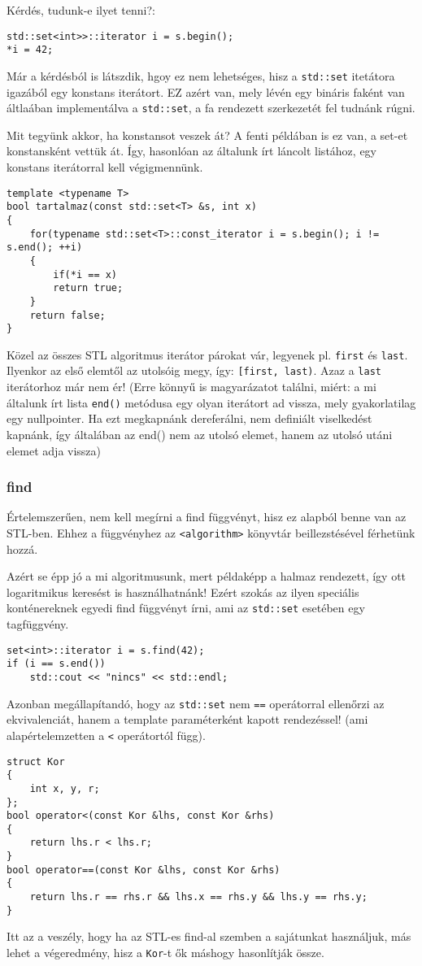 \documentclass[a4paper,11.5pt]{article}
\begin{document}
	\medskip
	Kérdés, tudunk-e ilyet tenni?:
\begin{lstlisting}
std::set<int>>::iterator i = s.begin();
*i = 42;
\end{lstlisting}
	Már a kérdésból is látszdik, hgoy ez nem lehetséges, hisz a \texttt{std::set} itetátora igazából egy konstans iterátort. EZ azért van, mely lévén egy bináris faként van áltlaában implementálva a \texttt{std::set}, a fa rendezett szerkezetét fel tudnánk rúgni.
	
	\smallskip
	Mit tegyünk akkor, ha konstansot veszek át? A fenti példában is ez van, a set-et konstansként vettük át. Így, hasonlóan az általunk írt láncolt listához, egy konstans iterátorral kell végigmennünk.
\begin{lstlisting}
template <typename T>
bool tartalmaz(const std::set<T> &s, int x)
{
	for(typename std::set<T>::const_iterator i = s.begin(); i != s.end(); ++i)
	{
		if(*i == x)
		return true;
	}
	return false;
}
\end{lstlisting}
	
	\medskip
	Közel az összes STL algoritmus iterátor párokat vár, legyenek pl. \texttt{first} és \texttt{last}. Ilyenkor az első elemtől az utolsóig megy, így: \texttt{[first, last)}. Azaz a \texttt{last} iterátorhoz már nem ér! (Erre könnyű is magyarázatot találni, miért: a mi általunk írt lista \texttt{end()} metódusa egy olyan iterátort ad vissza, mely gyakorlatilag egy nullpointer. Ha ezt megkapnánk dereferálni, nem definiált viselkedést kapnánk, így általában az end() nem az utolsó elemet, hanem az utolsó utáni elemet adja vissza)
	
	\subsubsection{find}
	Értelemszerűen, nem kell megírni a find függvényt, hisz ez alapból benne van az STL-ben. Ehhez a függvényhez az \texttt{<algorithm>} könyvtár beillezstésével férhetünk hozzá. 
	
	\medskip
	Azért se épp jó a mi algoritmusunk, mert példaképp a halmaz rendezett, így ott logaritmikus keresést is használhatnánk! Ezért szokás az ilyen speciális konténereknek egyedi find függvényt írni, ami az \texttt{std::set} esetében egy tagfüggvény. 
\begin{lstlisting}
set<int>::iterator i = s.find(42);
if (i == s.end())
	std::cout << "nincs" << std::endl;
\end{lstlisting}
	Azonban megállapítandó, hogy az \texttt{std::set} nem \texttt{==} operátorral ellenőrzi az ekvivalenciát, hanem a template paraméterként kapott rendezéssel! (ami alapértelemzetten a \texttt{<} operátortól függ).
\begin{lstlisting}
struct Kor
{
	int x, y, r;
};
bool operator<(const Kor &lhs, const Kor &rhs)
{
	return lhs.r < lhs.r;
}
bool operator==(const Kor &lhs, const Kor &rhs)
{
	return lhs.r == rhs.r && lhs.x == rhs.y && lhs.y == rhs.y;
}
\end{lstlisting}
	Itt az a veszély, hogy ha az STL-es find-al szemben a sajátunkat használjuk, más lehet a végeredmény, hisz a \texttt{Kor}-t ők máshogy hasonlítják össze.
	
\end{document}
